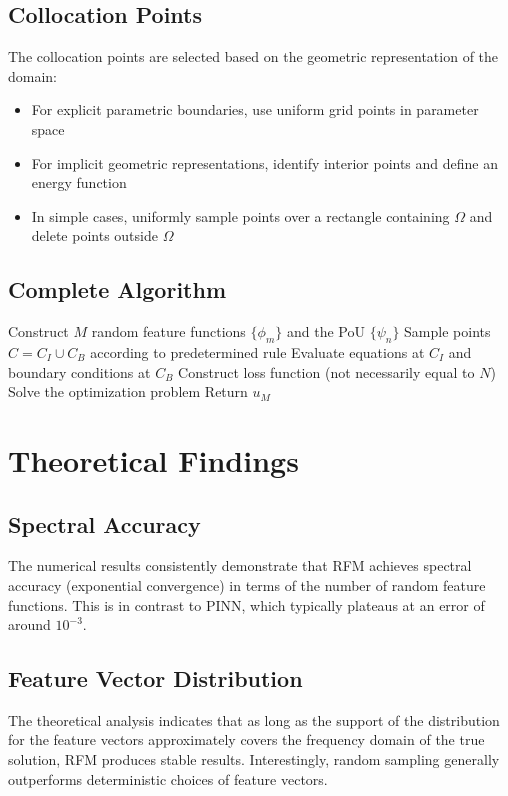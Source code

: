 \documentclass[11pt]{article}
\begin{document}
\subsection{Collocation Points}
The collocation points are selected based on the geometric representation of the domain:
\begin{itemize}
    \item For explicit parametric boundaries, use uniform grid points in parameter space
    \item For implicit geometric representations, identify interior points and define an energy function
    \item In simple cases, uniformly sample points over a rectangle containing $\Omega$ and delete points outside $\Omega$
\end{itemize}

\subsection{Complete Algorithm}
\begin{algorithm}[H]
\caption{The Random Feature Method}
\begin{algorithmic}[1]
\STATE Construct $M$ random feature functions $\{\phi_m\}$ and the PoU $\{\psi_n\}$
\STATE Sample points $C = C_I \cup C_B$ according to predetermined rule
\STATE Evaluate equations at $C_I$ and boundary conditions at $C_B$
\STATE Construct loss function (not necessarily equal to $N$)
\STATE Solve the optimization problem
\STATE Return $u_M$
\end{algorithmic}
\end{algorithm}

\section{Theoretical Findings}

\subsection{Spectral Accuracy}
The numerical results consistently demonstrate that RFM achieves spectral accuracy (exponential convergence) in terms of the number of random feature functions. This is in contrast to PINN, which typically plateaus at an error of around $10^{-3}$.

\subsection{Feature Vector Distribution}
The theoretical analysis indicates that as long as the support of the distribution for the feature vectors approximately covers the frequency domain of the true solution, RFM produces stable results. Interestingly, random sampling generally outperforms deterministic choices of feature vectors.
\end{document}
